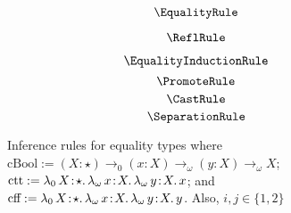 
\begin{figure}
    \centering
    \begin{minipage}{0.5\textwidth}
        $$\EqualityRule$$
    \end{minipage}%
    \begin{minipage}{0.5\textwidth}
        $$\ReflRule$$
    \end{minipage}%
    $$\EqualityInductionRule$$
    $$\PromoteRule$$
    $$\CastRule$$
    $$\SeparationRule$$
    \caption{
        Inference rules for equality types where
        $\text{cBool} := (X : \star) \to_0 (x : X) \to_\omega (y : X) \to_\omega X$;
        $\text{ctt} := \abs{\lambda_0}{X}{\star}{
            \abs{\lambda_\omega}{x}{X}{
                \abs{\lambda_\omega}{y}{X}{x}
            }
        }$;
        and
        $\text{cff} := \abs{\lambda_0}{X}{\star}{
            \abs{\lambda_\omega}{x}{X}{
                \abs{\lambda_\omega}{y}{X}{y}
            }
        }$.
        Also, $i, j \in \{ 1, 2 \}$
    }
\end{figure}
